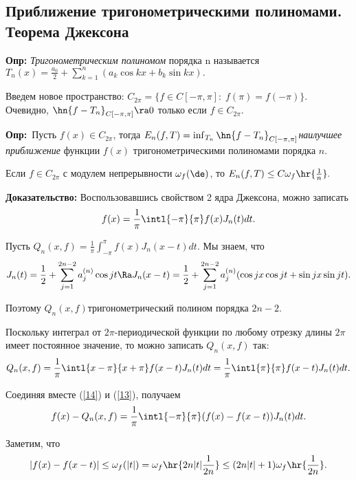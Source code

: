 \documentclass[a4paper]{article}
\def\defin{\noindent\textbf{Опр:}\ }
\begin{document}
\subsection{Приближение тригонометрическими полиномами. Теорема Джексона}
\textbf{Опр:} \emph{Тригонометрическим полиномом} порядка n
называется $T_n(x)=\frac{a_0}2+\sum_{k=1}^n (a_k\cos kx+b_k\sin
kx).$

\medskip Введем новое пространство: $C_{2\pi}=\{f\in
C[-\pi,\pi]:\;f(\pi)=f(-\pi)\}.$ Очевидно,
$\hn{f-T_n}_{C[-\pi,\pi]}\ra 0$ только если $f\in
C_{2\pi}.$

\defin Пусть $f(x)\in C_{2\pi}$, тогда $E_n(f,T)=\inf_{T_n}\hn{f-T_n}_{C[-\pi,\pi]}$\т \emph{наилучшее приближение} функции $f(x)$ тригонометрическими полиномами порядка $n.$

\begin{theorems}[Джексона] Если $f\in C_{2\pi}$ с модулем непрерывности $\omega_f(\de)$, то $E_n(f,T)\le
C\omega_f\hr{\frac1n}.$
\end{theorems}
\textbf{Доказательство:} Воспользовавшись свойством 2 ядра
Джексона, можно записать
\begin{equation}\label{14}
f(x)=\frac1{\pi}\intl{-\pi}{\pi}f(x)J_n(t)dt.
\end{equation}

Пусть $Q_n(x,f)=\frac1{\pi}\int_{-\pi}^{\pi}f(x)J_n(x-t)dt.$ Мы
знаем, что
$$J_n(t)=\frac12+\sum_{j=1}^{2n-2}a_j^{(n)}\cos jt\Ra
J_n(x-t)=\frac12+\sum_{j=1}^{2n-2}a_j^{(n)}(\cos jx\cos jt+\sin
jx\sin jt).$$

Поэтому $Q_n(x,f)$\т тригонометрический полином порядка $2n-2.$

Поскольку интеграл от $2\pi$-периодической функции по любому
отрезку длины $2\pi$ имеет постоянное значение, то можно записать
$Q_n(x,f)$ так:
\begin{equation}\label{13}
Q_n(x,f)=\frac1{\pi}\intl{x-\pi}{x+\pi}f(x-t)J_n(t)dt=\frac1{\pi}\intl{\pi}{\pi}f(x-t)J_n(t)dt.
\end{equation}

Соединяя вместе (\ref{14}) и (\ref{13}), получаем
\begin{equation}\label{15}
f(x)-Q_n(x,f)=\frac1{\pi}\intl{-\pi}{\pi}(f(x)-f(x-t))J_n(t)dt.
\end{equation}

Заметим, что
\begin{equation*}
|f(x)-f(x-t)|\le\omega_f(|t|)=\omega_f\hr{2n|t|\frac1{2n}}\le(2n|t|+1)\omega_f\hr{\frac1{2n}}.
\end{equation*}
\end{document}
